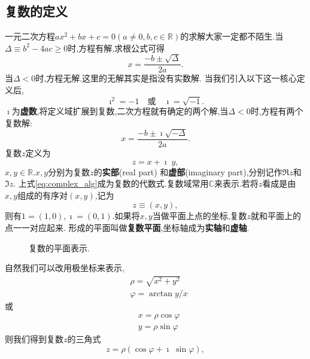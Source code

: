 


\subsection{复数的定义}
一元二次方程$a x^2 + b x + c = 0 (a\neq 0, b,c \in \mathbb{R})$的求解大家一定都不陌生.当$\Delta \equiv b^2 - 4 a c \geq 0$时,方程有解,求根公式可得
\begin{equation}
    x = \frac{-b \pm \sqrt{\Delta}}{2a} .
\end{equation}
当$\Delta < 0$时,方程无解.这里的无解其实是指没有实数解.
当我们引入以下这一核心定义后,
\begin{equation}
    \imath ^2 = -1 \quad \textrm{或} \quad \imath = \sqrt{-1} . 
\end{equation}
$\imath$为{\bf 虚数},将定义域扩展到复数,二次方程就有确定的两个解,当$\Delta < 0$时,方程有两个复数解:
\begin{equation}
    x = \frac{-b \pm \imath \sqrt{-\Delta}}{2a} .
\end{equation}
复数$z$定义为
\begin{equation}
    \label{eq:complex_alg}
    z = x + \imath \; y ,
\end{equation}
$x,y \in {\mathbb{R}}$.$x,y$分别为复数$z$的{\bf 实部}(real part) 和{\bf 虚部}(imaginary part),分别记作$\Re z$和$\Im z$.
上式\eqref{eq:complex_alg}成为复数的代数式.复数域常用$\mathbb{C}$来表示.若将$z$看成是由$x,y$组成的有序对$(x,y)$,记为
\begin{equation}
    z \equiv (x,y),
\end{equation}
则有$1 = (1,0), \imath = (0, 1)$.如果将$x,y$当做平面上点的坐标,复数$z$就和平面上的点一一对应起来.
形成的平面叫做{\bf 复数平面},坐标轴成为{\bf 实轴}和{\bf 虚轴}.
\begin{figure}[htb]
    \centering
    
  \caption{复数的平面表示.} \label{fig:complex_plane}
\end{figure} 
自然我们可以改用极坐标来表示,
\begin{align}
    & \rho = \sqrt{x^2 + y^2}\\
    & \varphi = \arctan y/x
\end{align}
或
\begin{align}
    & x = \rho \cos\varphi \\
    & y = \rho \sin\varphi 
\end{align}
则我们得到复数$z$的三角式
\begin{equation}
    z = \rho (\cos\varphi +  \imath\; \sin\varphi) ,
\end{equation}
